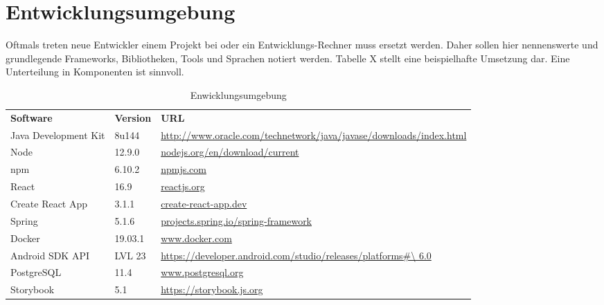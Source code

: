 \section{Entwicklungsumgebung}\label{sec:entwicklungsumgebung}
\begin{tcolorbox}
	Oftmals treten neue Entwickler einem Projekt bei oder ein Entwicklungs-Rechner muss ersetzt werden.
	Daher sollen hier nennenswerte und grundlegende Frameworks, Bibliotheken, Tools und Sprachen notiert werden.
	Tabelle X stellt eine beispielhafte Umsetzung dar.
	Eine Unterteilung in Komponenten ist sinnvoll.
\end{tcolorbox}

\begin{table}[h]
	\centering
	\begin{tabularx}{\textwidth}{l l X}
		\rowcolor[HTML]{C0C0C0} 
		\textbf{Software} & \textbf{Version} & \textbf{URL} \\
		Java Development Kit & 8u144 & \url{http://www.oracle.com/technetwork/java/javase/downloads/index.html} \\
		\rowcolor[HTML]{E7E7E7} 
		Node & 12.9.0 & \url{nodejs.org/en/download/current} \\
		npm & 6.10.2 & \url{npmjs.com} \\
		\rowcolor[HTML]{E7E7E7} 
		React &16.9 &\url{reactjs.org}\\
		Create React App & 3.1.1 & \url{create-react-app.dev} \\
		\rowcolor[HTML]{E7E7E7} 
		Spring & 5.1.6 & \url{projects.spring.io/spring-framework} \\
		Docker & 19.03.1& \url{www.docker.com} \\
		\rowcolor[HTML]{E7E7E7} 
		Android SDK API&LVL 23 & \url {https://developer.android.com/studio/releases/platforms\#\ 6.0} \\
		PostgreSQL &11.4 & \url{www.postgresql.org} \\
		\rowcolor[HTML]{E7E7E7}
		Storybook & 5.1 &\url {https://storybook.js.org} \\
		
		
	\end{tabularx}
	\caption{Enwicklungsumgebung}
	\label{table:entwicklungsumgebung}
\end{table}